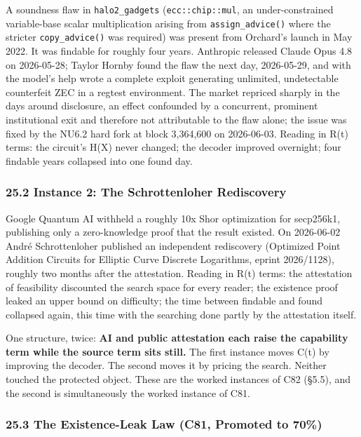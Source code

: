 \documentclass[
  11pt,
]{article}
\begin{document}
A soundness flaw in \texttt{halo2\_gadgets} (\texttt{ecc::chip::mul}, an
under-constrained variable-base scalar multiplication arising from
\texttt{assign\_advice()} where the stricter \texttt{copy\_advice()} was
required) was present from Orchard's launch in May 2022. It was findable
for roughly four years. Anthropic released Claude Opus 4.8 on
2026-05-28; Taylor Hornby found the flaw the next day, 2026-05-29, and
with the model's help wrote a complete exploit generating unlimited,
undetectable counterfeit ZEC in a regtest environment. The market
repriced sharply in the days around disclosure, an effect confounded by
a concurrent, prominent institutional exit and therefore not
attributable to the flaw alone; the issue was fixed by the NU6.2 hard
fork at block 3,364,600 on 2026-06-03. Reading in R(t) terms: the
circuit's H(X) never changed; the decoder improved overnight; four
findable years collapsed into one found day.

\subsubsection{25.2 Instance 2: The Schrottenloher
Rediscovery}\label{instance-2-the-schrottenloher-rediscovery}

Google Quantum AI withheld a roughly 10x Shor optimization for
secp256k1, publishing only a zero-knowledge proof that the result
existed. On 2026-06-02 André Schrottenloher published an independent
rediscovery (Optimized Point Addition Circuits for Elliptic Curve
Discrete Logarithms, eprint 2026/1128), roughly two months after the
attestation. Reading in R(t) terms: the attestation of feasibility
discounted the search space for every reader; the existence proof leaked
an upper bound on difficulty; the time between findable and found
collapsed again, this time with the searching done partly by the
attestation itself.

One structure, twice: \textbf{AI and public attestation each raise the
capability term while the source term sits still.} The first instance
moves C(t) by improving the decoder. The second moves it by pricing the
search. Neither touched the protected object. These are the worked
instances of C82 (§5.5), and the second is simultaneously the worked
instance of C81.

\subsubsection{25.3 The Existence-Leak Law (C81, Promoted to
70\%)}\label{the-existence-leak-law-c81-promoted-to-70}
\end{document}

